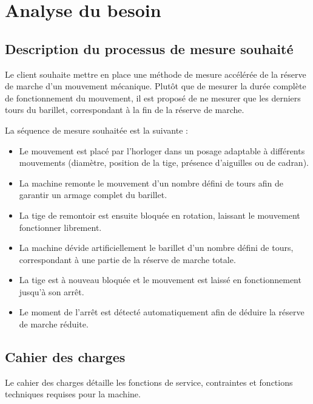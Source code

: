 \chapter{Analyse du besoin}

\section{Description du processus de mesure souhaité}

Le client souhaite mettre en place une méthode de mesure accélérée de la réserve de marche d’un mouvement mécanique. 
Plutôt que de mesurer la durée complète de fonctionnement du mouvement, il est proposé de ne mesurer que les derniers tours du barillet, correspondant à la fin de la réserve de marche.

La séquence de mesure souhaitée est la suivante :

\begin{itemize}
    \item Le mouvement est placé par l’horloger dans un posage adaptable à différents mouvements (diamètre, position de la tige, présence d’aiguilles ou de cadran).
    \item La machine remonte le mouvement d’un nombre défini de tours afin de garantir un armage complet du barillet.
    \item La tige de remontoir est ensuite bloquée en rotation, laissant le mouvement fonctionner librement.
    \item La machine dévide artificiellement le barillet d’un nombre défini de tours, correspondant à une partie de la réserve de marche totale.
    \item La tige est à nouveau bloquée et le mouvement est laissé en fonctionnement jusqu’à son arrêt.
    \item Le moment de l’arrêt est détecté automatiquement afin de déduire la réserve de marche réduite.
\end{itemize}



\section{Cahier des charges}

Le cahier des charges détaille les fonctions de service, contraintes et fonctions techniques requises pour la machine.

